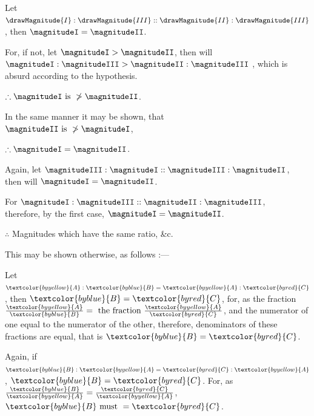\documentclass[booklanguage=english]{byrnebook}
\begin{document}
\vfill\pagebreak


\begin{center}
Let $\drawMagnitude{I} : \drawMagnitude{III} :: \drawMagnitude{II} : \drawMagnitude{III}$, then $\magnitudeI = \magnitudeII$.

For, if not, let $\magnitudeI > \magnitudeII$, then will\\
$\magnitudeI : \magnitudeIII > \magnitudeII : \magnitudeIII$ ,
which is absurd according to the hypothesis.

$\therefore \magnitudeI \mbox{ is } \ngtr \magnitudeII$. %

In the same manner it may be shown, that\\
$\magnitudeII \mbox{ is } \ngtr \magnitudeI$, %

$\therefore \magnitudeI = \magnitudeII$.

Again, let $\magnitudeIII : \magnitudeI :: \magnitudeIII : \magnitudeII$,\\
then will $\magnitudeI = \magnitudeII$.

For  $\magnitudeI : \magnitudeIII :: \magnitudeII : \magnitudeIII$,\\
therefore, by the first case, $\magnitudeI = \magnitudeII$.

$\therefore$ Magnitudes which have the same ratio, \&c.
\end{center}

This may be shown otherwise, as follows :—

Let $\textcolor{byyellow}{A} : \textcolor{byblue}{B} = \textcolor{byyellow}{A} : \textcolor{byred}{C}$, then $\textcolor{byblue}{B} = \textcolor{byred}{C}$, for, as the fraction $\frac{\textcolor{byyellow}{A}}{\textcolor{byblue}{B}} = \mbox{ the fraction } \frac{\textcolor{byyellow}{A}}{\textcolor{byred}{C}}$, and the numerator of one equal to the numerator of the other, therefore, denominators of these fractions are equal, that is $\textcolor{byblue}{B} = \textcolor{byred}{C}$.

Again, if $\textcolor{byblue}{B} : \textcolor{byyellow}{A} = \textcolor{byred}{C} : \textcolor{byyellow}{A}$, $\textcolor{byblue}{B} = \textcolor{byred}{C}$. For, as $\frac{\textcolor{byblue}{B}}{\textcolor{byyellow}{A}} = \frac{\textcolor{byred}{C}}{\textcolor{byyellow}{A}}$, $\textcolor{byblue}{B} \mbox{ must } = \textcolor{byred}{C}$.
\end{document}
